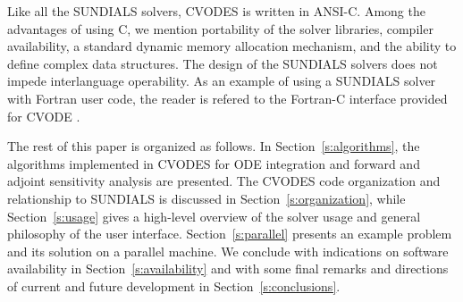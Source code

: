 Like all the SUNDIALS solvers, CVODES is written in ANSI-C.
Among the advantages of using C, we mention portability of the solver libraries, 
compiler availability, a standard dynamic memory allocation mechanism, and the
ability to define complex data structures.
The design of the SUNDIALS solvers does not impede interlanguage operability. 
As an example of using a SUNDIALS solver with Fortran user code, the reader is 
refered to the Fortran-C interface provided for CVODE \cite{HiSe:04cvode,HBGLSSW:04}.

The rest of this paper is organized as follows. In Section~\ref{s:algorithms}, the
algorithms implemented in CVODES for ODE integration and forward and adjoint 
sensitivity analysis are presented. The CVODES code organization and relationship
to SUNDIALS is discussed in Section~\ref{s:organization}, while Section~\ref{s:usage}
gives a high-level overview of the solver usage and general
philosophy of the user interface. 
Section~\ref{s:parallel} presents an example problem and its solution on a
parallel machine.
We conclude with indications on software availability
in Section~\ref{s:availability} and with some final remarks and directions
of current and future development in Section~\ref{s:conclusions}.
